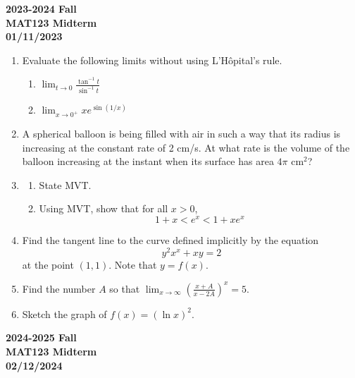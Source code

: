 \documentclass[a4paper, 12pt]{article}
\begin{document}
\newpage
{}
{}

\begin{center}
\textbf{2023-2024 Fall\\MAT123 Midterm\\01/11/2023}
\end{center}

\begin{enumerate}[leftmargin=*,label=\textbf{\arabic*.}]
\item Evaluate the following limits without using L'Hôpital's rule.
\begin{enumerate}[leftmargin=*,label=\textbf{\alph*.}]
\item $\displaystyle \lim_{t\to 0} \frac{\tan^{-1} t}{\sin^{-1} t}$
\item $\displaystyle \lim_{x\to 0^+} x e^{\displaystyle \sin(1/x)}$
\end{enumerate}

\item A spherical balloon is being filled with air in such a way that its radius is increasing at the constant rate of 2 cm/s. At what rate is the volume of the balloon increasing at the instant when its surface has area $4\pi$ cm$^2$?

\item
\begin{enumerate}[leftmargin=*,label=\textbf{\alph*.}]
\item State MVT.
\item Using MVT, show that for all $x>0$,
\[1+x< e^x<1+x e^x\]
\end{enumerate}

\item Find the tangent line to the curve defined implicitly by the equation
\[y^2x^x+xy=2\]
at the point $(1,1)$. Note that $y=f(x)$.

\item Find the number $A$ so that $\displaystyle\lim_{x\to\infty}\left(\frac{x+A}{x-2A}\right)^{x}=5$.

\item Sketch the graph of $f(x)=(\ln x)^2$.

\end{enumerate}

\newpage
{}
{}

\begin{center}
\textbf{2024-2025 Fall\\MAT123 Midterm\\02/12/2024}
\end{center}
\end{document}
